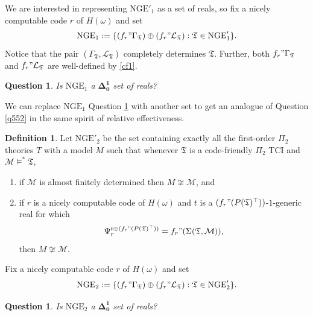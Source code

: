 \documentclass[12pt, twoside]{memoir}
\numberwithin{equation}{section}
\newtheorem{ques}[thm]{Question}
\theoremstyle{definition}
\newtheorem{defi}[thm]{Definition}
\theoremstyle{remark}
\theoremstyle{definition}
\theoremstyle{definition}
\theoremstyle{definition}
\theoremstyle{remark}
\begin{document}
We are interested in representing $\mathrm{NGE}'_1$ as a set of reals, so fix a nicely computable code $r$ of $H(\omega)$ and set
\begin{equation*}
    \mathrm{NGE}_1 := \{(f_r" \Gamma_{\mathfrak{T}}) \oplus (f_r" \mathcal{L}_{\mathfrak{T}}) : \mathfrak{T} \in \mathrm{NGE}'_1\} \text{.}
\end{equation*}
Notice that the pair $(\Gamma_{\mathfrak{T}}, \mathcal{L}_{\mathfrak{T}})$ completely determines $\mathfrak{T}$. Further, both $f_r" \Gamma_{\mathfrak{T}}$ and $f_r" \mathcal{L}_{\mathfrak{T}}$ are well-defined by \ref{cf1}.

\begin{ques}\label{q553}
Is $\mathrm{NGE}_1$ a $\mathbf{\Delta^1_0}$ set of reals?
\end{ques}

We can replace $\mathrm{NGE}_1$ Question \ref{q553} with another set to get an analogue of Question \ref{q552} in the same spirit of relative effectiveness. 

\begin{defi}
Let $\mathrm{NGE}'_2$ be the set containing exactly all the first-order $\Pi_2$ theories $T$ with a model $M$ such that whenever $\mathfrak{T}$ is a code-friendly $\Pi_2$ TCI and $\mathcal{M} \models^* \mathfrak{T}$,
\begin{enumerate}[label=(\alph*)]
    \item if $\mathcal{M}$ is almost finitely determined then $M \not \cong \mathcal{M}$, and
    \item if $r$ is a nicely computable code of $H(\omega)$ and $t$ is a $(f_r" (P(\mathfrak{T})^{\top}))$-$1$-generic real for which
    \begin{equation*}
        \Psi_r^{t \oplus (f_r" (P(\mathfrak{T})^{\top}))} = f_r" (\Sigma(\mathfrak{T}, \mathcal{M})) \text{,}
    \end{equation*}
    then $M \not \cong \mathcal{M}$.
\end{enumerate}
\end{defi}

Fix a nicely computable code $r$ of $H(\omega)$ and set
\begin{equation*}
    \mathrm{NGE}_2 := \{(f_r" \Gamma_{\mathfrak{T}}) \oplus (f_r" \mathcal{L}_{\mathfrak{T}}) : \mathfrak{T} \in \mathrm{NGE}'_2\} \text{.}
\end{equation*}

\begin{ques}
Is $\mathrm{NGE}_2$ a $\mathbf{\Delta^1_0}$ set of reals?
\end{ques}
\end{document}
